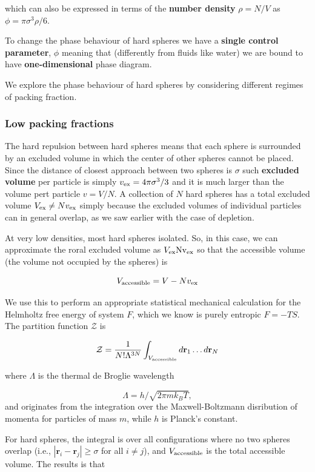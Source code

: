 \documentclass[
  letterpaper,
  enabledeprecatedfontcommands]{report}
\begin{document}
which can also be expressed in terms of the \textbf{number density}
\(\rho=N/V\) as \(\phi=\pi\sigma^3\rho/6\).

To change the phase behaviour of hard spheres we have a \textbf{single
control parameter}, \(\phi\) meaning that (differently from fluids like
water) we are bound to have \textbf{one-dimensional} phase diagram.

We explore the phase behaviour of hard spheres by considering different
regimes of packing fraction.

\subsubsection*{Low packing fractions}\label{low-packing-fractions}

The hard repulsion between hard spheres means that each sphere is
surrounded by an excluded volume in which the center of other spheres
cannot be placed. Since the distance of closest approach between two
spheres is \(\sigma\) such \textbf{excluded volume} per particle is
simply \(v_{\rm ex} =4\pi\sigma^3/3\) and it is much larger than the
volume pert particle \(v= V/N\). A collection of \(N\) hard spheres has
a total excluded volume \(V_{\rm ex}\neq N v_{\rm ex}\) simply because
the excluded volumes of individual particles can in general overlap, as
we saw earlier with the case of depletion.

At very low densities, most hard spheres isolated. So, in this case, we
can approximate the roral excluded volume as
\(V_{\rm ex} \rm N v_{\rm ex}\) so that the accessible volume (the
volume not occupied by the spheres) is

\[V_{\rm accessible} = V-Nv_{\rm ex}\]

We use this to perform an appropriate statistical mechanical calculation
for the Helmholtz free energy of system \(F\), which we know is purely
entropic \(F=-TS\). The partition function \(\mathcal{Z}\) is

\[
\mathcal{Z} = \frac{1}{N! \Lambda^{3N}} \int_{V_{\rm accessible}} d\mathbf{r}_1 \ldots d\mathbf{r}_N
\]

where \(\Lambda\) is the thermal de Broglie wavelength

\[\Lambda = h/\sqrt{2\pi mk_B T},\] and originates from the integration
over the Maxwell-Boltzmann disribution of momenta for particles of mass
\(m\), while \(h\) is Planck's constant.

For hard spheres, the integral is over all configurations where no two
spheres overlap (i.e., \(|\mathbf{r}_i - \mathbf{r}_j| \geq \sigma\) for
all \(i \neq j\)), and \(V_{\rm accessible}\) is the total accessible
volume. The results is that
\end{document}
